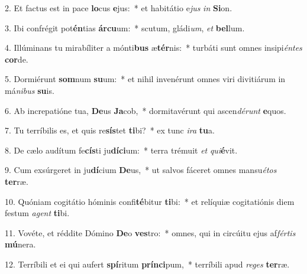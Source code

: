 2. Et factus est in pace \textbf{lo}cus \textbf{e}jus:~*  et habitátio e\textit{jus} \textit{in} \textbf{Si}on.\

3. Ibi confrégit pot\textbf{én}tias \textbf{ár}\textbf{cu}um:~*  scutum, gládi\textit{um}, \textit{et} \textbf{bel}lum.\

4. Illúminans tu mirabíliter a mónti\textbf{bus} æ\textbf{tér}nis:~*  turbáti sunt omnes insipi\textit{én}\textit{tes} \textbf{cor}de.\

5. Dormiérunt \textbf{som}num \textbf{su}um:~*  et nihil invenérunt omnes viri divitiárum in má\textit{ni}\textit{bus} \textbf{su}is.\

6. Ab increpatióne tua, \textbf{De}us \textbf{Ja}cob,~*  dormitavérunt qui ascen\textit{dé}\textit{runt} \textbf{e}quos.\

7. Tu terríbilis es, et quis re\textbf{sís}tet \textbf{ti}bi?~*  ex tunc \textit{i}\textit{ra} \textbf{tu}a.\

8. De cælo audítum fe\textbf{cís}ti ju\textbf{dí}\textbf{ci}um:~*  terra trémuit \textit{et} \textit{qui}\textbf{é}vit.\

9. Cum exsúrgeret in ju\textbf{dí}cium \textbf{De}us,~*  ut salvos fáceret omnes mansu\textit{é}\textit{tos} \textbf{ter}ræ.\

10. Quóniam cogitátio hóminis confi\textbf{té}bitur \textbf{ti}bi:~*  et relíquiæ cogitatiónis diem festum \textit{a}\textit{gent} \textbf{ti}bi.\

11. Vovéte, et réddite Dómino \textbf{De}o \textbf{ves}tro:~*  omnes, qui in circúitu ejus af\textit{fér}\textit{tis} \textbf{mú}nera.\

12. Terríbili et ei qui aufert \textbf{spí}ritum \textbf{prín}\textbf{ci}pum,~*  terríbili apud \textit{re}\textit{ges} \textbf{ter}ræ.\


